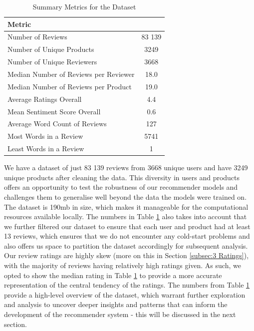 \begin{table}[h]
  \centering
  \begin{tabular}{|p{10cm}|c|}
  \hline
  \textbf{Metric}                                & \textbf{}            \\
  \hline
  Number of Reviews                     & 83 139          \\
  \hline
  Number of Unique Products             & 3249          \\
  \hline
  Number of Unique Reviewers            & 3668          \\
  \hline
  Median Number of Reviews per Reviewer& 18.0        \\
  \hline
  Median Number of Reviews per Product & 19.0  \\
  \hline
  Average Ratings Overall               & 4.4        \\
  \hline
  Mean Sentiment Score Overall          & 0.6           \\
  \hline
  Average Word Count of Reviews         & 127        \\
  \hline
  Most Words in a Review                &   5741      \\
  \hline
  Least Words in a Review               &   1      \\
  \hline
  \end{tabular}
  \caption{Summary Metrics for the Dataset}
  \label{tab:data statistics overview}
  \end{table}

 We have a dataset of just 83 139 reviews from 3668 unique users and have 3249 unique products after cleaning the data. This diversity in users and products offers an opportunity to test the robustness of our recommender models and challenges them to generalise well beyond the data the models were trained on. The dataset is 190mb in size, which makes it manageable for the computational resources available locally. The numbers in Table \ref{tab:data statistics overview} also takes into account that we further filtered our dataset to ensure that each user and product had at least 13 reviews, which ensures that we do not encounter any cold-start problems and also offers us space to partition the dataset accordingly for subsequent analysis. Our review ratings are highly skew (more on this in Section \ref{subsec:3 Ratings}), with the majority of reviews having relatively high ratings given. As such, we opted to show the median rating in Table \ref{tab:data statistics overview} to provide a more accurate representation of the central tendency of the ratings. The numbers from Table \ref{tab:data statistics overview} provide a high-level overview of the dataset, which warrant further exploration and analysis to uncover deeper insights and patterns that can inform the development of the recommender system - this will be discussed in the next section.

